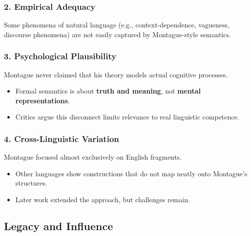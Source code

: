 \documentclass[12pt]{article}
\newcommand{\tightlist}{\itemsep 0pt\parskip 0pt\parsep 0pt}
\begin{document}
\hypertarget{empirical-adequacy}{%
\subsubsection{\texorpdfstring{2. \textbf{Empirical
Adequacy}}{2. Empirical Adequacy}}\label{empirical-adequacy}}

Some phenomena of natural language (e.g., context-dependence, vagueness,
discourse phenomena) are not easily captured by Montague-style
semantics.

\hypertarget{psychological-plausibility}{%
\subsubsection{\texorpdfstring{3. \textbf{Psychological
Plausibility}}{3. Psychological Plausibility}}\label{psychological-plausibility}}

Montague never claimed that his theory models actual cognitive
processes.

\begin{itemize}
\tightlist
\item
  Formal semantics is about \textbf{truth and meaning}, not
  \textbf{mental representations}.
\item
  Critics argue this disconnect limits relevance to real linguistic
  competence.
\end{itemize}

\hypertarget{cross-linguistic-variation}{%
\subsubsection{\texorpdfstring{4. \textbf{Cross-Linguistic
Variation}}{4. Cross-Linguistic Variation}}\label{cross-linguistic-variation}}

Montague focused almost exclusively on English fragments.

\begin{itemize}
\tightlist
\item
  Other languages show constructions that do not map neatly onto
  Montague's structures.
\item
  Later work extended the approach, but challenges remain.
\end{itemize}

\hypertarget{legacy-and-influence}{%
\subsection{Legacy and Influence}\label{legacy-and-influence}}
\end{document}
